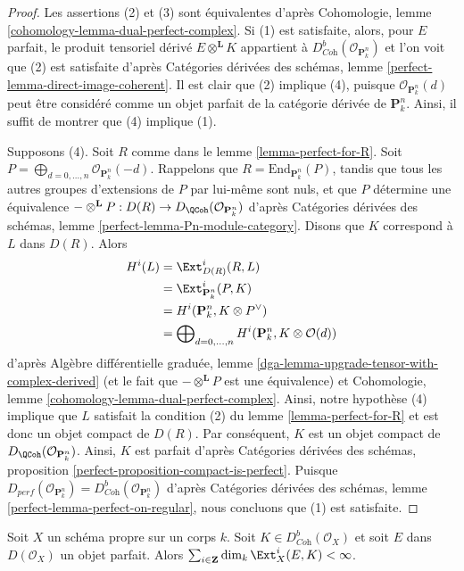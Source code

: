 \begin{proof}
Les assertions (2) et (3) sont équivalentes d'après
Cohomologie, lemme \ref{cohomology-lemma-dual-perfect-complex}.
Si (1) est satisfaite, alors, pour $E$ parfait, le produit tensoriel dérivé
$E \otimes^\mathbf{L} K$ appartient à
$D^b_{\textit{Coh}}(\mathcal{O}_{\mathbf{P}^n_k})$
et l'on voit que (2) est satisfaite d'après
Catégories dérivées des schémas, lemme \ref{perfect-lemma-direct-image-coherent}.
Il est clair que (2) implique (4), puisque $\mathcal{O}_{\mathbf{P}^n_k}(d)$
peut être considéré
comme un objet parfait de la catégorie dérivée de $\mathbf{P}^n_k$.
Ainsi, il suffit de montrer que (4) implique (1).

\medskip\noindent
Supposons (4). Soit $R$ comme dans le lemme \ref{lemma-perfect-for-R}.
Soit $P = \bigoplus_{d = 0, \ldots, n} \mathcal{O}_{\mathbf{P}^n_k}(-d)$.
Rappelons que $R = \text{End}_{\mathbf{P}^n_k}(P)$, tandis que tous les autres groupes
d'extensions de $P$ par lui-même sont nuls, et que $P$ détermine une équivalence
$- \otimes^\mathbf{L} P : D(R) \to D_\QCoh(\mathcal{O}_{\mathbf{P}^n_k})$
d'après Catégories dérivées des schémas, lemme \ref{perfect-lemma-Pn-module-category}.
Disons que $K$ correspond à $L$ dans $D(R)$. Alors
\begin{align*}
H^i(L)
& =
\Ext^i_{D(R)}(R, L) \\
& =
\Ext^i_{\mathbf{P}^n_k}(P, K) \\
& =
H^i(\mathbf{P}^n_k, K \otimes P^\vee) \\
& =
\bigoplus\nolimits_{d = 0, \ldots, n}
H^i(\mathbf{P}^n_k, K \otimes \mathcal{O}(d))
\end{align*}
d'après Algèbre différentielle graduée, lemme
\ref{dga-lemma-upgrade-tensor-with-complex-derived}
(et le fait que $- \otimes^\mathbf{L} P$ est une équivalence)
et Cohomologie, lemme \ref{cohomology-lemma-dual-perfect-complex}.
Ainsi, notre hypothèse (4) implique que $L$ satisfait la condition (2) du
lemme \ref{lemma-perfect-for-R} et est donc un objet compact de $D(R)$.
Par conséquent, $K$ est un objet compact de
$D_\QCoh(\mathcal{O}_{\mathbf{P}^n_k})$.
Ainsi, $K$ est parfait d'après
Catégories dérivées des schémas, proposition
\ref{perfect-proposition-compact-is-perfect}.
Puisque $D_{perf}(\mathcal{O}_{\mathbf{P}^n_k}) =
D^b_{\textit{Coh}}(\mathcal{O}_{\mathbf{P}^n_k})$
d'après
Catégories dérivées des schémas, lemme \ref{perfect-lemma-perfect-on-regular},
nous concluons que (1) est satisfaite.
\end{proof}

\begin{lemma}
\label{lemma-finiteness}
Soit $X$ un schéma propre sur un corps $k$. Soit
$K \in D^b_{\textit{Coh}}(\mathcal{O}_X)$ et soit $E$ dans $D(\mathcal{O}_X)$
un objet parfait. Alors
$\sum_{i \in \mathbf{Z}} \dim_k \Ext^i_X(E, K) < \infty$.
\end{lemma}

